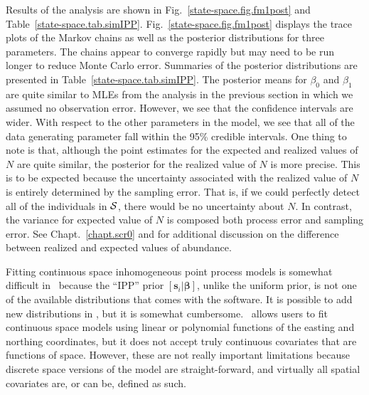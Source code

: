 Results of the analysis are shown in
Fig.~\ref{state-space.fig.fm1post} and
Table~\ref{state-space.tab.simIPP}.
Fig.~\ref{state-space.fig.fm1post}
displays the trace plots of the Markov chains as well as the posterior
distributions for three parameters. The chains appear to
converge rapidly but may need to be run longer to reduce Monte Carlo
error. Summaries of the posterior distributions are presented in
Table~\ref{state-space.tab.simIPP}. The posterior means for $\beta_0$
and $\beta_1$ are quite similar to MLEs from the analysis in the
previous section in which we assumed no observation error. However, we
see that the confidence intervals are wider. With respect to the other
parameters in the model, we see that all of the data
generating parameter fall within the 95\% credible intervals. One
thing to note is that, although the point estimates for
the expected and realized values of $N$ are quite similar, the
posterior for the realized value of $N$ is more precise. This is to be
expected because the uncertainty associated with the realized value of
$N$ is entirely determined by the sampling error. That is,
if we could perfectly detect all of the individuals in $\cal S$, there
would be no uncertainty about $N$. In contrast, the variance for
expected value of $N$ is composed both process error and sampling
error. See Chapt.~\ref{chapt.scr0} and
\citet{efford_fewster:2012} for additional discussion on the
difference between realized and expected values of abundance.


Fitting continuous space inhomogeneous point process models is somewhat
difficult in \bugs~because the ``IPP'' prior $[\mathbf{s}_i | \bm
\beta]$, unlike the uniform prior, is not one of the
available distributions that comes with the software. It is
possible to add new distributions in \bugs, but it is somewhat
cumbersome.  \secr~allows
users to fit continuous space models using linear or polynomial functions of the easting and northing
coordinates, but it does not accept truly continuous covariates that
are functions of space. However, these
are not really important limitations because discrete
space versions of the model are straight-forward, and virtually all spatial
covariates are, or can be, defined as such.


